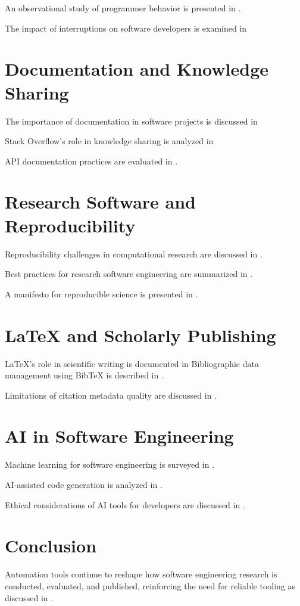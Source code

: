 \documentclass[12pt]{article}
\begin{document}
An observational study of programmer behavior is presented in \cite{Zhang2020retrievalb}.

The impact of interruptions on software developers is examined in

\section{Documentation and Knowledge Sharing}
The importance of documentation in software projects is discussed in 

Stack Overflow’s role in knowledge sharing is analyzed in 

API documentation practices are evaluated in \cite{IEEEieeestanda}.

\section{Research Software and Reproducibility}
Reproducibility challenges in computational research are discussed in \cite{Peng2011reproducib}.

Best practices for research software engineering are summarized in \cite{Kaya2021learningmu}.

A manifesto for reproducible science is presented in \cite{Baker20161500scient}.

\section{LaTeX and Scholarly Publishing}
LaTeX’s role in scientific writing is documented in 
Bibliographic data management using BibTeX is described in \cite{Cheng1978generating}.

Limitations of citation metadata quality are discussed in \cite{Chodpathumwan2021structural}.

\section{AI in Software Engineering}
Machine learning for software engineering is surveyed in \cite{Allamanis2017asurveyofm}.

AI-assisted code generation is analyzed in \cite{Chen2021evaluating}.

Ethical considerations of AI tools for developers are discussed in \cite{Bender2021onthedange}.

\section{Conclusion}
Automation tools continue to reshape how software engineering research is conducted, evaluated, and published, reinforcing the need for reliable tooling as discussed in \cite{Guizzo2020costmeasur}.
\end{document}
